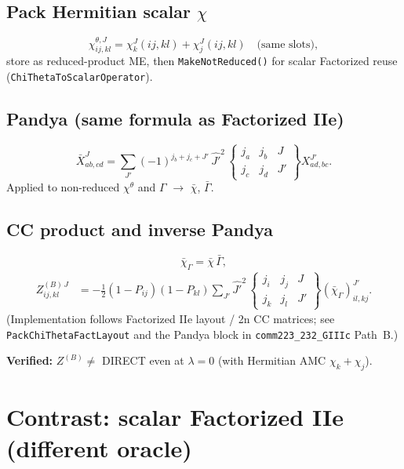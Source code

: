 \documentclass[11pt]{article}
\newcommand{\sixj}[6]{\begin{Bmatrix} #1 & #2 & #3 \\ #4 & #5 & #6 \end{Bmatrix}}
\newcommand{\Jhat}[1]{\widehat{#1}}
\begin{document}
\subsection{Pack Hermitian scalar $\chi$}
\begin{equation}
\chi^{\theta,J}_{ij,kl}
=\chi_k^{J}(ij,kl)+\chi_j^{J}(ij,kl)
\quad\text{(same slots)},
\label{eq:chi-sum}
\end{equation}
store as reduced-product ME, then \texttt{MakeNotReduced()} for scalar
Factorized reuse (\texttt{ChiThetaToScalarOperator}).

\subsection{Pandya (same formula as Factorized IIe)}
\begin{equation}
\bar X^{J}_{ab,cd}
=\sum_{J'}(-1)^{j_b+j_c+J'}\,\Jhat{J'}^{2}\,
\sixj{j_a}{j_b}{J}{j_c}{j_d}{J'}
X^{J'}_{ad,bc}.
\label{eq:pandya}
\end{equation}
Applied to non-reduced $\chi^\theta$ and $\Gamma$ $\to$ $\bar\chi$, $\bar\Gamma$.

\subsection{CC product and inverse Pandya}
\begin{equation}
\bar\chi_\Gamma = \bar\chi\,\bar\Gamma,
\label{eq:barchiG}
\end{equation}
\begin{equation}
\begin{aligned}
Z^{(B)\,J}_{ij,kl}
&=-\frac12(1-P_{ij})(1-P_{kl})
\sum_{J'}\Jhat{J'}^{2}\,
\sixj{j_i}{j_j}{J}{j_k}{j_l}{J'}
(\bar\chi_\Gamma)^{J'}_{il,kj}.
\end{aligned}
\label{eq:pathb-z}
\end{equation}
(Implementation follows Factorized IIe layout / 2n CC matrices;
see \texttt{PackChiThetaFactLayout} and the Pandya block in
\texttt{comm223\_232\_GIIIc} Path~B.)

\textbf{Verified:} $Z^{(B)}\neq$ DIRECT even at $\lambda=0$
(with Hermitian AMC $\chi_k+\chi_j$).

\section{Contrast: scalar Factorized IIe (different oracle)}
\label{sec:iie}
\end{document}
